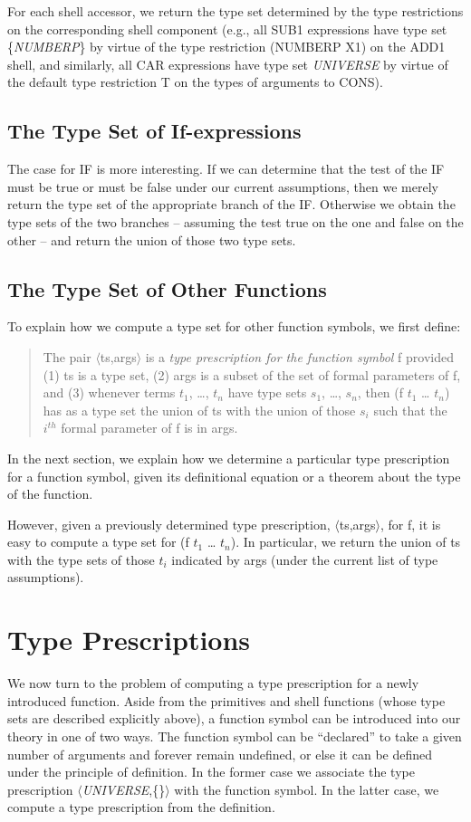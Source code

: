 \documentclass[11pt]{book}
\newenvironment{pubcrown}{\begin{quote}}{\end{quote}}
\newcommand{\pubinlineunderline}[1]{\emph{#1}}
\newcommand{\pubdefaulttextsize}{\large}
\begin{document}
For each shell accessor, we return the type set determined by the
type restrictions on the corresponding shell component (e.g., all SUB1
expressions have type set \{\pubinlineunderline{NUMBERP}\} by virtue of the type restriction
(NUMBERP X1)
on the ADD1 shell, and similarly, all CAR expressions have type set \pubinlineunderline{UNIVERSE}
by virtue of the default type restriction T on the types of arguments to CONS).
\subsection{The Type Set of If-expressions}
\pubdefaulttextsize
The case for IF is more interesting.  If we can determine that the test of the IF must be true
or must be false under our current assumptions, then we 
merely return the type set of the appropriate branch of the IF.
Otherwise we  obtain the
type sets of the two branches -- assuming the test true on the one and
false on the other -- and return the union of those two type sets.
\subsection{The Type Set of Other Functions}
\pubdefaulttextsize
To explain how we compute a type set for other function symbols,
we first define:
\begin{pubcrown}
The pair $\langle$ts,args$\rangle$ is a \pubinlineunderline{type prescription for the function symbol} f
provided (1) ts is a type set, (2) args is a subset of the set of formal
parameters of f, and (3) whenever terms $t_{1}$, \ldots{}, $t_{n}$ have type sets
$s_{1}$, \ldots{}, $s_{n}$, then (f $t_{1}$ \ldots{} $t_{n}$) has as a type set the union of ts
with the union of those $s_{i}$ such that the $i^{th}$ formal parameter of f is in args.
\end{pubcrown}

In the next section, we explain how we determine a particular
type prescription for a function symbol, given its definitional equation
or a theorem about the type of the function.

However, given a previously determined type prescription, $\langle$ts,args$\rangle$, for f,
it is easy to compute a type set for (f $t_{1}$ \ldots{} $t_{n}$).  In particular,
we return the union of ts with the type sets of those $t_{i}$ indicated by args
(under the current list of type assumptions).
\section{Type Prescriptions}
\pubdefaulttextsize
We now turn to the problem of computing a type prescription for a newly introduced
function.  Aside from the primitives and shell functions (whose type sets
are described explicitly above), a function symbol can be introduced into our theory
in one of two ways.  The function symbol can be ``declared'' to take a given number of arguments
and forever remain undefined, or else it can be defined under
the principle of definition.  In the former case we associate the type prescription
$\langle$\pubinlineunderline{UNIVERSE},\{\}$\rangle$ with the function symbol.  In the latter case,
we compute a type prescription from the definition.
\end{document}
